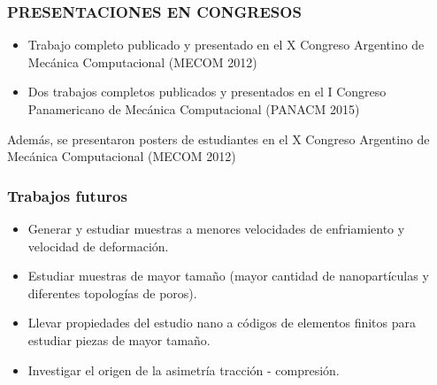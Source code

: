 \begin{frame}
 \frametitle{PRESENTACIONES EN CONGRESOS}
 \vspace{0.2cm}
 \begin{itemize}
  \item Trabajo completo publicado y presentado en el X Congreso Argentino de Mecánica Computacional (MECOM 2012)
  \vspace{0.2cm}
  \item Dos trabajos completos publicados y presentados en el I Congreso Panamericano de Mecánica Computacional (PANACM 2015)
 \end{itemize}
  \vspace{0.5cm}
  Además, se presentaron posters de estudiantes en el X Congreso Argentino de Mecánica Computacional (MECOM 2012) 
\end{frame}


\begin{frame}
 \frametitle{Trabajos futuros}
 \vspace{0.3cm}
 \begin{itemize}
  \item Generar y estudiar muestras a menores velocidades de enfriamiento y velocidad de deformación.
  \vspace{0.4cm}
  \item Estudiar muestras de mayor tamaño (mayor cantidad de nanopartículas y diferentes topologías de poros).
  \vspace{0.4cm}
  \item Llevar propiedades del estudio nano a códigos de elementos finitos para estudiar piezas de mayor tamaño.
  \vspace{0.4cm}
  \item Investigar el origen de la asimetría tracción - compresión.
 \end{itemize}
\end{frame}
